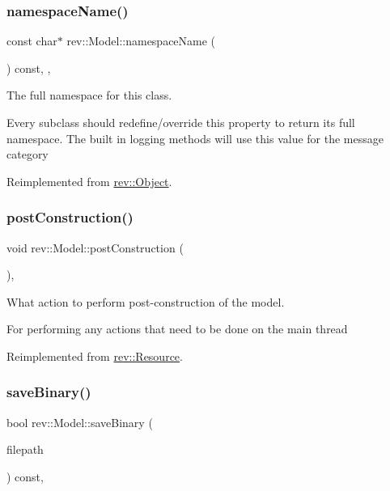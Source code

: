 \subsubsection{\texorpdfstring{namespaceName()}{namespaceName()}}
{\footnotesize\ttfamily const char$\ast$ rev\+::\+Model\+::namespace\+Name (\begin{DoxyParamCaption}{ }\end{DoxyParamCaption}) const\hspace{0.3cm}{\ttfamily [inline]}, {\ttfamily [override]}, {\ttfamily [virtual]}}



The full namespace for this class. 

Every subclass should redefine/override this property to return its full namespace. The built in logging methods will use this value for the message category 

Reimplemented from \mbox{\hyperlink{classrev_1_1_object_aaeb638d3e10f361c56c211a318a27f3d}{rev\+::\+Object}}.

\mbox{\label{classrev_1_1_model_a30a84dac2ff91c87bf920dd3a68411e5}} 
\subsubsection{\texorpdfstring{postConstruction()}{postConstruction()}}
{\footnotesize\ttfamily void rev\+::\+Model\+::post\+Construction (\begin{DoxyParamCaption}{ }\end{DoxyParamCaption})\hspace{0.3cm}{\ttfamily [override]}, {\ttfamily [virtual]}}



What action to perform post-\/construction of the model. 

For performing any actions that need to be done on the main thread 

Reimplemented from \mbox{\hyperlink{classrev_1_1_resource_a8a6daa71820d88c86bc6c0aa474d1af7}{rev\+::\+Resource}}.

\mbox{\label{classrev_1_1_model_a2ca39792d2c6fbd73ca726a6145041ad}} 
\subsubsection{\texorpdfstring{saveBinary()}{saveBinary()}}
{\footnotesize\ttfamily bool rev\+::\+Model\+::save\+Binary (\begin{DoxyParamCaption}\item[{const \mbox{\hyperlink{classrev_1_1_g_string}{G\+String}} \&}]{filepath }\end{DoxyParamCaption}) const\hspace{0.3cm}{\ttfamily [override]}, {\ttfamily [virtual]}}



